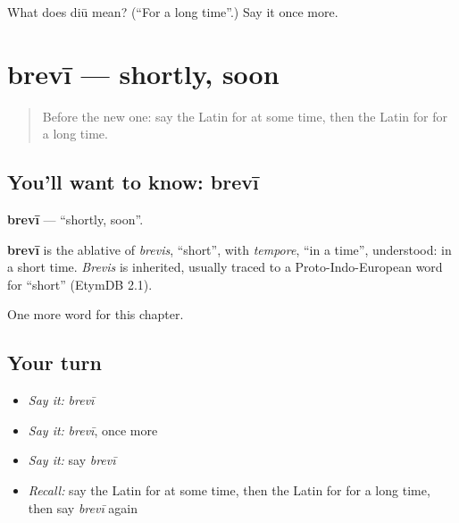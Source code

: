 \begin{tcolorbox}[breakable,colback=teal!4,colframe=teal!35!black,title={Before you move on}]
What does diū mean? (\textquotedblleft{}For a long time\textquotedblright{}.) Say it once more.
\end{tcolorbox}
\section[brevī]{brevī — shortly, soon}

\label{lesson:LA-C263-brevi}



\begin{quote}
Before the new one: say the Latin for at some time, then the Latin for for a long time.
\end{quote}

\subsection*{You'll want to know: brevī}
\textbf{brevī} — \textquotedblleft{}shortly, soon\textquotedblright{}.

\begin{cousinweb}
\textbf{brevī} is the ablative of \emph{brevis}, \textquotedblleft{}short\textquotedblright{}, with \emph{tempore}, \textquotedblleft{}in a time\textquotedblright{}, understood: in a short time. \emph{Brevis} is inherited, usually traced to a Proto-Indo-European word for \textquotedblleft{}short\textquotedblright{} (EtymDB 2.1).
\end{cousinweb}

\begin{grammarlens}[title={What you've built}]
One more word for this chapter.
\end{grammarlens}

\subsection*{Your turn}
\begin{itemize}
\raggedright
  \item \emph{Say it:} \emph{brevī}
  \item \emph{Say it:} \emph{brevī}, once more
  \item \emph{Say it:} say \emph{brevī}
  \item \emph{Recall:} say the Latin for at some time, then the Latin for for a long time, then say \emph{brevī} again
\end{itemize}

